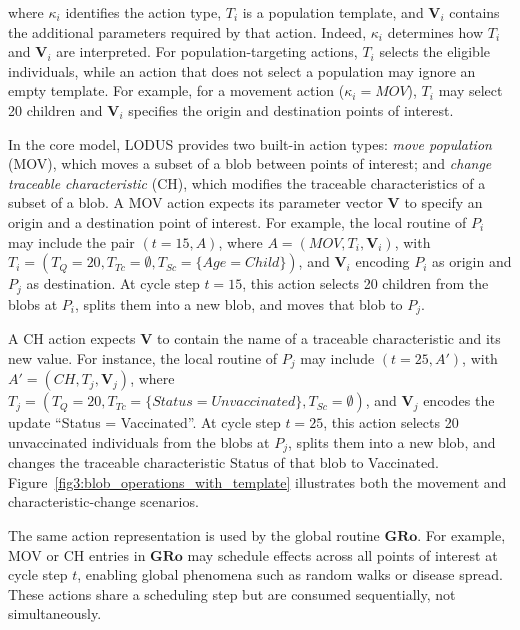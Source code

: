 where $\kappa_i$ identifies the action type, %
$T_i$ is a population template, and $\bm{V}_i$ contains the additional parameters required by that action.
Indeed, $\kappa_i$ determines how $T_i$ and $\bm{V}_i$ are interpreted. For population-targeting actions, %
$T_i$ selects the eligible individuals, while an action that does not select a population may ignore an empty template. For example, for a movement action ($\kappa_i=MOV$), $T_i$ may select 20 children and $\bm{V}_i$ specifies the origin and destination points of interest.

In the core model, LODUS provides two built-in action types:
\textit{move population} (MOV), which moves a subset of a blob between points of interest; and \textit{change traceable characteristic} (CH), which modifies the traceable characteristics of a subset of a blob.
A MOV action expects its parameter vector $\bm{V}$ to specify an origin and a destination point of interest. For example, the local routine of $P_i$ may include the pair $(t = 15, A)$, where $A = (MOV, T_i, \bm{V}_i)$, with $T_i=(T_Q=20, T_{Tc}=\emptyset, T_{Sc}=\{Age=Child\})$, and $\bm{V}_i$ encoding $P_i$ as origin and $P_j$ as destination. At cycle step $t = 15$, this action selects 20 children from the blobs at $P_i$, splits them into a new blob, and moves that blob to $P_j$.

A CH action expects $\bm{V}$ to contain the name of a traceable characteristic and its new value. For instance, the local routine of $P_j$ may include $(t = 25, A')$, with $A' = (CH, T_j, \bm{V}_j)$, where $T_j=(T_Q=20, T_{Tc}=\{Status=Unvaccinated\}, T_{Sc}=\emptyset)$, and $\bm{V}_j$ encodes the update ``Status = Vaccinated''. At cycle step $t=25$, this action selects 20 unvaccinated individuals from the blobs at $P_j$, splits them into a new blob, and changes the traceable characteristic Status of that blob to Vaccinated. Figure~\ref{fig3:blob_operations_with_template} illustrates both the movement and characteristic-change scenarios.


The same action representation is used by the global routine $\bm{GRo}$. For example, MOV or CH entries in $\bm{GRo}$ may schedule effects across all points of interest at cycle step $t$, enabling global phenomena such as random walks or disease spread. These actions share a scheduling step but are consumed sequentially, not simultaneously. 


